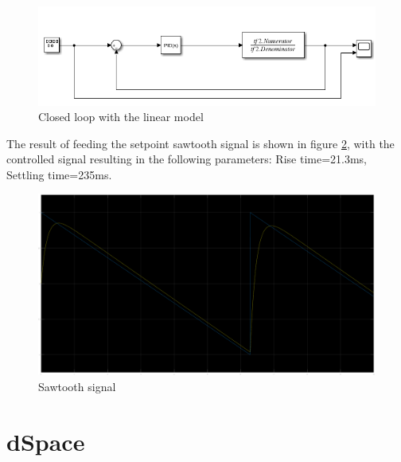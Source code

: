 \documentclass[]{final_report}
\begin{document}
\begin{figure} [h!]
\centerline{\includegraphics[width=.75\textwidth]{Screenshots for paper/arduino/Final_hardware_testing/closed_loop_linear.PNG}}
\caption{Closed loop with the linear model}
\label{fig:arduinoSetupClosedLoop}
\end{figure}

The result of feeding the setpoint sawtooth signal is shown in figure \ref{fig:Arduino_sawtooth}, with the controlled signal resulting in the following parameters: Rise time=21.3ms, Settling time=235ms.

\begin{figure} [h!]
\centerline{\includegraphics[width=.75\textwidth]{Screenshots for paper/arduino/Final_hardware_testing/sawtooth_response.png}}
\caption{Sawtooth signal}
\label{fig:Arduino_sawtooth}
\end{figure}

\section{dSpace}
\end{document}
